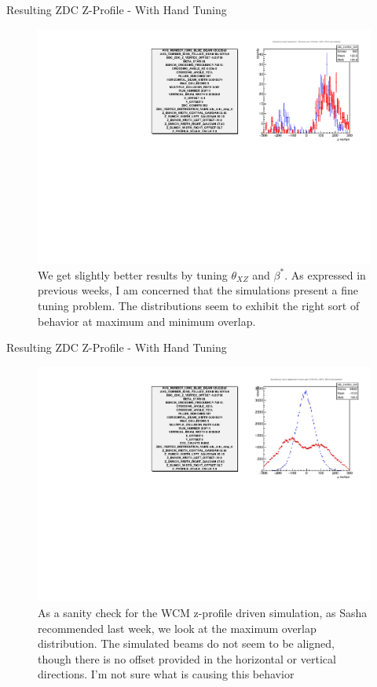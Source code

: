 \begin{frame}{Resulting ZDC Z-Profile - With Hand Tuning}
\begin{figure}
\begin{center}
\includegraphics[width=0.8\linewidth]{../ExploringZProfile/figs/359711_step_0_zvertex_compare_tuned.pdf}
\end{center}
\caption{We get slightly better results by tuning $\theta_{XZ}$ and $\beta^{*}$.
	As expressed in previous weeks, I am concerned that the simulations present a
	fine tuning problem. The distributions seem to exhibit the right sort of
behavior at maximum and minimum overlap.}
\label{fig:359711_step_0_zvertex_compare_tuned}
\end{figure}
\end{frame}

\begin{frame}{Resulting ZDC Z-Profile - With Hand Tuning}
\begin{figure}
\begin{center}
\includegraphics[width=0.8\linewidth]{../ExploringZProfile/figs/359711_step_6_zvertex_compare.pdf}
\end{center}
\caption{As a sanity check for the WCM z-profile driven simulation, as Sasha
	recommended last week, we look at the maximum overlap distribution. The
	simulated beams do not seem to be aligned, though there is no offset provided
	in the horizontal or vertical directions. I'm not sure what is causing this
behavior}
\label{fig:359711_step_6_zvertex_compare}
\end{figure}
\end{frame}


